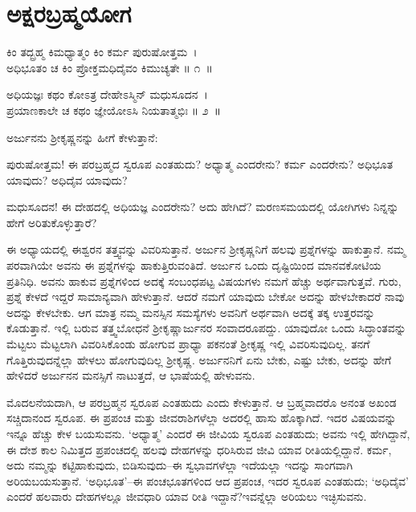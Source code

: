 
\chapter{ಅಕ್ಷರಬ್ರಹ್ಮಯೋಗ}

\begin{shloka}
ಕಿಂ ತದ್ಬ್ರಹ್ಮ ಕಿಮಧ್ಯಾತ್ಮಂ ಕಿಂ ಕರ್ಮ ಪುರುಷೋತ್ತಮ~।\\ಅಧಿಭೂತಂ ಚ ಕಿಂ ಪ್ರೋಕ್ತಮಧಿದೈವಂ ಕಿಮುಚ್ಯತೇ \hfill॥ ೧~॥
\end{shloka}

\begin{shloka}
ಅಧಿಯಜ್ಞಃ ಕಥಂ ಕೋಽತ್ರ ದೇಹೇಽಸ್ಮಿನ್ ಮಧುಸೂದನ~।\\ಪ್ರಯಾಣಕಾಲೇ ಚ ಕಥಂ ಜ್ಞೇಯೋಽಸಿ ನಿಯತಾತ್ಮಭಿಃ \hfill॥ ೨~॥
\end{shloka}

ಅರ್ಜುನನು ಶ‍್ರೀಕೃಷ್ಣನನ್ನು ಹೀಗೆ ಕೇಳುತ್ತಾನೆ:

\begin{artha}
ಪುರುಷೋತ್ತಮ! ಈ ಪರಬ್ರಹ್ಮದ ಸ್ವರೂಪ ಎಂತಹುದು? ಅಧ್ಯಾತ್ಮ ಎಂದರೇನು? ಕರ್ಮ ಎಂದರೇನು? ಅಧಿಭೂತ ಯಾವುದು? ಅಧಿದೈವ ಯಾವುದು?
\end{artha}

\begin{artha}
ಮಧುಸೂದನ! ಈ ದೇಹದಲ್ಲಿ ಅಧಿಯಜ್ಞ ಎಂದರೇನು? ಅದು ಹೇಗಿದೆ? ಮರಣಸಮಯದಲ್ಲಿ ಯೋಗಿಗಳು ನಿನ್ನನ್ನು ಹೇಗೆ ಅರಿತುಕೊಳ್ಳುತ್ತಾರೆ?
\end{artha}

ಈ ಅಧ್ಯಾಯದಲ್ಲಿ ಈಶ್ವರನ ತತ್ತ್ವವನ್ನು ವಿವರಿಸುತ್ತಾನೆ. ಅರ್ಜುನ ಶ‍್ರೀಕೃಷ್ಣನಿಗೆ ಹಲವು ಪ್ರಶ್ನೆಗಳನ್ನು ಹಾಕುತ್ತಾನೆ. ನಮ್ಮ ಪರವಾಗಿಯೇ ಅವನು ಈ ಪ್ರಶ್ನೆಗಳನ್ನು ಹಾಕುತ್ತಿರುವಂತಿದೆ. ಅರ್ಜುನ ಒಂದು ದೃಷ್ಟಿಯಿಂದ ಮಾನವಕೋಟಿಯ ಪ್ರತಿನಿಧಿ. ಅವನು ಹಾಕುವ ಪ್ರಶ್ನೆಗಳಿಂದ ಅದಕ್ಕೆ ಸಂಬಂಧಪಟ್ಟ ವಿಷಯಗಳು ನಮಗೆ ಹೆಚ್ಚು ಅರ್ಥವಾಗುತ್ತವೆ. ಗುರು, ಪ್ರಶ್ನೆ ಕೇಳದೆ ಇದ್ದರೆ ಸಾಮಾನ್ಯವಾಗಿ ಹೇಳುತ್ತಾನೆ. ಆದರೆ ನಮಗೆ ಯಾವುದು ಬೇಕೋ ಅದನ್ನು ಹೇಳಬೇಕಾದರೆ ನಾವು ಅದನ್ನು ಕೇಳಬೇಕು. ಆಗ ಮಾತ್ರ ನಮ್ಮ ಮನಸ್ಸಿನ ಸಮಸ್ಯೆಗಳು ಅವನಿಗೆ ಅರ್ಥವಾಗಿ ಅದಕ್ಕೆ ತಕ್ಕ ಉತ್ತರವನ್ನು ಕೊಡುತ್ತಾನೆ. ಇಲ್ಲಿ ಬರುವ ತತ್ತ್ವಬೋಧನೆ ಶ‍್ರೀಕೃಷ್ಣಾರ್ಜುನರ ಸಂವಾದರೂಪದ್ದು. ಯಾವುದೋ ಒಂದು ಸಿದ್ಧಾಂತವನ್ನು ಮೆಟ್ಟಲು ಮೆಟ್ಟಲಾಗಿ ವಿವರಿಸಿಕೊಂಡು ಹೋಗುವ ಪ್ರಾಧ್ಯಾ ಪಕನಂತೆ ಶ‍್ರೀಕೃಷ್ಣ ಇಲ್ಲಿ ವಿವರಿಸುವುದಿಲ್ಲ. ತನಗೆ ಗೊತ್ತಿರುವುದನ್ನೆಲ್ಲಾ ಹೇಳಲು ಹೋಗುವುದಿಲ್ಲ ಶ‍್ರೀಕೃಷ್ಣ. ಅರ್ಜುನನಿಗೆ ಏನು ಬೇಕು, ಎಷ್ಟು ಬೇಕು, ಅದನ್ನು ಹೇಗೆ ಹೇಳಿದರೆ ಅರ್ಜುನನ ಮನಸ್ಸಿಗೆ ನಾಟುತ್ತದೆ, ಆ ಭಾಷೆಯಲ್ಲಿ ಹೇಳುವನು.

ಮೊದಲನೆಯದಾಗಿ, ಆ ಪರಬ್ರಹ್ಮನ ಸ್ವರೂಪ ಎಂತಹುದು ಎಂದು ಕೇಳುತ್ತಾನೆ. ಆ ಬ್ರಹ್ಮವಾದರೊ ಅನಂತ ಅಖಂಡ ಸಚ್ಚಿದಾನಂದ ಸ್ವರೂಪ. ಈ ಪ್ರಪಂಚ ಮತ್ತು ಜೀವರಾಶಿಗಳೆಲ್ಲಾ ಅದರಲ್ಲಿ ಹಾಸು ಹೊಕ್ಕಾಗಿದೆ. ಇದರ ವಿಷಯವನ್ನು ಇನ್ನೂ ಹೆಚ್ಚು ಕೇಳ ಬಯಸುವನು. ‘ಅಧ್ಯಾತ್ಮ’ ಎಂದರೆ ಈ ಜೀವಿಯ ಸ್ವರೂಪ ಎಂತಹುದು; ಅವನು ಇಲ್ಲಿ ಹೇಗಿದ್ದಾನೆ, ಈ ದೇಶ ಕಾಲ ನಿಮಿತ್ತದ ಪ್ರಪಂಚದಲ್ಲಿ ಹಲವು ದೇಹಗಳನ್ನು ಧರಿಸಿರುವ ಜೀವಿ ಯಾವ ರೀತಿಯಲ್ಲಿದ್ದಾನೆ. ಕರ್ಮ, ಅದು ನಮ್ಮನ್ನು ಕಟ್ಟಿಹಾಕುವುದು, ಬಿಡಿಸುವುದು–ಈ ಸ್ವಭಾವಗಳೆಲ್ಲಾ ಇದೆಯಲ್ಲಾ ಇದನ್ನು ಸಾಂಗವಾಗಿ ಅರಿಯಬಯಸುತ್ತಾನೆ. ‘ಅಧಿಭೂತ’–ಈ ಪಂಚಭೂತಗಳಿಂದ ಆದ ಪ್ರಪಂಚ, ಇದರ ಸ್ವರೂಪ ಎಂತಹುದು; ‘ಅಧಿದೈವ’ ಎಂದರೆ ಹಲವಾರು ದೇಹಗಳಲ್ಲೂ ಜೀವಧಾರಿ ಯಾವ ರೀತಿ ಇದ್ದಾನೆ?ಇವನ್ನೆಲ್ಲಾ ಅರಿಯಲು ಇಚ್ಛಿಸುವನು.

